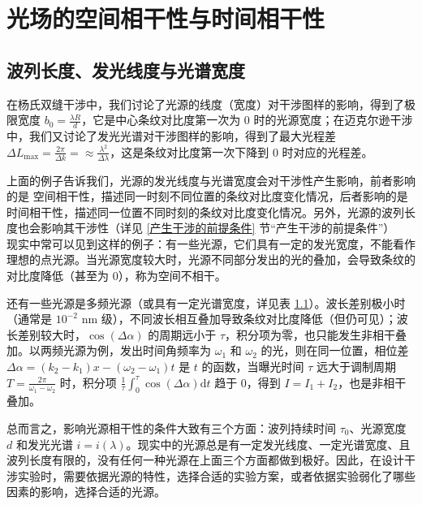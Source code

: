 \documentclass[UTF8]{report}
\theoremstyle{MyLineTheoremStyle} %
\theoremstyle{MyBlockTheoremStyle} %
\theoremstyle{MySubsubsectionStyle} %
\begin{document}
\section{光场的空间相干性与时间相干性}\label{光场的空间相干性与时间相干性}

\subsection{波列长度、发光线度与光谱宽度}

在杨氏双缝干涉中，我们讨论了光源的线度（宽度）对干涉图样的影响，得到了极限宽度 $b_0 = \frac{\lambda R}{d}$，它是中心条纹对比度第一次为 0 时的光源宽度；在迈克尔逊干涉中，我们又讨论了发光光谱对干涉图样的影响，得到了最大光程差 $\Delta L_{\max} = \frac{2 \pi}{\Delta k} = \approx \frac{\lambda^2}{\Delta \lambda}$，这是条纹对比度第一次下降到 0 时对应的光程差。

上面的例子告诉我们，光源的发光线度与光谱宽度会对干涉性产生影响，前者影响的是 {\color{red} 空间相干性}，描述同一时刻不同位置的条纹对比度变化情况，后者影响的是 {\color{red} 时间相干性}，描述同一位置不同时刻的条纹对比度变化情况。另外，光源的波列长度也会影响其干涉性（详见 \ref{产生干涉的前提条件} 节“产生干涉的前提条件”）
\\

现实中常可以见到这样的例子：有一些光源，它们具有一定的发光宽度，不能看作理想的点光源。当光源宽度较大时，光源不同部分发出的光的叠加，会导致条纹的对比度降低（甚至为 0），称为空间不相干。

还有一些光源是多频光源（或具有一定光谱宽度，详见表 \ref{}）。波长差别极小时（通常是 $10^{-2}$ nm 级），不同波长相互叠加导致条纹对比度降低（但仍可见）；波长差别较大时，$\cos(\Delta \alpha)$ 的周期远小于 $\tau$，积分项为零，也只能发生非相干叠加。以两频光源为例，发出时间角频率为 $\omega_1$ 和 $\omega_2$ 的光，则在同一位置，相位差 $\Delta \alpha = (k_2 - k_1)x - (\omega_2 - \omega_1)t$ 是 $t$ 的函数，当曝光时间 $\tau$ 远大于调制周期 $T = \frac{2 \pi}{\omega_1 - \omega_2}$ 时，积分项 $\frac{1}{\tau}\int_{0}^{\tau}  \cos(\Delta \alpha) \mathrm{d} t$ 趋于 0，得到 $I = I_1 + I_2$，也是非相干叠加。

总而言之，影响光源相干性的条件大致有三个方面：波列持续时间 $\tau_0$、光源宽度 $d$ 和发光光谱 $i = i(\lambda)$。现实中的光源总是有一定发光线度、一定光谱宽度、且波列长度有限的，没有任何一种光源在上面三个方面都做到极好。因此，在设计干涉实验时，需要依据光源的特性，选择合适的实验方案，或者依据实验弱化了哪些因素的影响，选择合适的光源。
\end{document}
